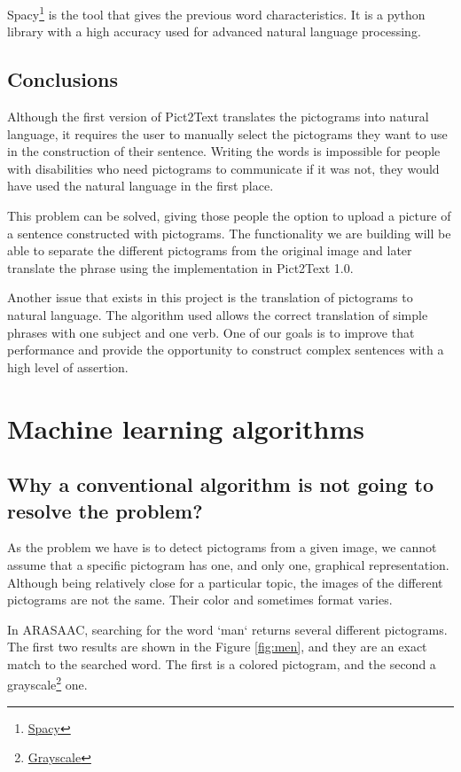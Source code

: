 Spacy\footnote{\href{https://spacy.io/}{Spacy}} is the tool that gives the previous word characteristics. It is a python library with a high accuracy used for advanced natural language processing.

\subsection{Conclusions}
Although the first version of Pict2Text translates the pictograms into natural language, it requires the user to manually select the pictograms they want to use in the construction of their sentence. Writing the words is impossible for people with disabilities who need pictograms to communicate if it was not, they would have used the natural language in the first place. 

This problem can be solved, giving those people the option to upload a picture of a sentence constructed with pictograms. The functionality we are building will be able to separate the different pictograms from the original image and later translate the phrase using the implementation in Pict2Text 1.0. 

Another issue that exists in this project is the translation of pictograms to natural language. The algorithm used allows the correct translation of simple phrases with one subject and one verb. One of our goals is to improve that performance and provide the opportunity to construct complex sentences with a high level of assertion. 

\section{Machine learning algorithms}
\subsection{Why a conventional algorithm is not going to resolve the problem?}
As the problem we have is to detect pictograms from a given image, we cannot assume that a specific pictogram has one, and only one, graphical representation. Although being relatively close for a particular topic, the images of the different pictograms are not the same. Their color and sometimes format varies.

In ARASAAC, searching for the word `man` returns several different pictograms. The first two results are shown in the Figure \ref{fig:men}, and they are an exact match to the searched word. The first is a colored pictogram, and the second a grayscale\footnote{\href{https://en.wikipedia.org/wiki/Grayscale}{Grayscale}} one.


